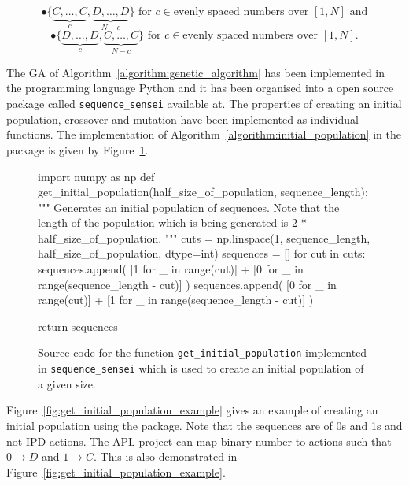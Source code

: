 \[\bullet \{\underbrace{C, \dots, C}_{c}, \underbrace{D, \dots, D}_{N-c}\} \text{ for } c \in \text{evenly spaced numbers over } [1, N] \text{ and}\]
\[\bullet \{\underbrace{D, \dots, D}_{c}, \underbrace{C, \dots, C}_{N-c}\} \text{ for } c \in \text{evenly spaced numbers over } [1, N].\]

The GA of Algorithm~\ref{algorithm:genetic_algorithm} has been implemented in the programming language Python
and it has been organised into a open source package called
\texttt{sequence_sensei} available at. %
The properties of creating an initial population, crossover and mutation have been
implemented as individual functions.
The implementation of Algorithm~\ref{algorithm:initial_population} in the package
is given by Figure~\ref{fig:get_initial_population}.

\begin{figure}[!htbp]
\begin{sourcepy}
import numpy as np
def get_initial_population(half_size_of_population, sequence_length):
    """
    Generates an initial population of sequences. Note that the length
    of the population which is being generated is 2 * half_size_of_population.
    """
    cuts = np.linspace(1, sequence_length, half_size_of_population, dtype=int)
    sequences = []
    for cut in cuts:
        sequences.append(
            [1 for _ in range(cut)] + [0 for _ in range(sequence_length - cut)]
        )
        sequences.append(
            [0 for _ in range(cut)] + [1 for _ in range(sequence_length - cut)]
        )

    return sequences
\end{sourcepy}
\caption{Source code for the function \texttt{get_initial_population}
implemented in \texttt{sequence_sensei} which is used to create an
initial population of a given size.}\label{fig:get_initial_population}
\end{figure}

Figure~\ref{fig:get_initial_population_example} gives an example of creating an
initial population using the package. Note that the sequences are of 0s and 1s
and not IPD actions. The APL project can map binary number to actions such that
\(0 \to D\) and \(1 \to C\). This is also demonstrated in
Figure~\ref{fig:get_initial_population_example}.

